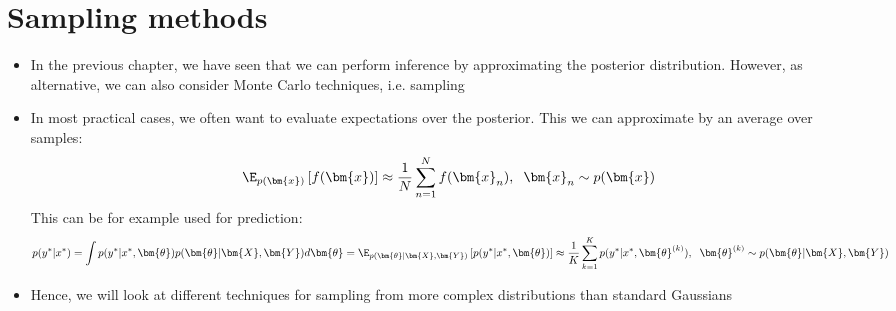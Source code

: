 \section{Sampling methods}
\begin{itemize}
	\item In the previous chapter, we have seen that we can perform inference by approximating the posterior distribution. However, as alternative, we can also consider Monte Carlo techniques, i.e. sampling
	\item In most practical cases, we often want to evaluate expectations over the posterior. This we can approximate by an average over samples:
	$$\E_{p(\bm{x})}\left[f(\bm{x})\right] \approx \frac{1}{N}\sum_{n=1}^{N} f(\bm{x}_n), \hspace{2mm} \bm{x}_n\sim p(\bm{x})$$
	This can be for example used for prediction:
	$$p(y^{*}|x^{*}) = \int p(y^{*}\vert x^{*}, \bm{\theta})p(\bm{\theta}|\bm{X}, \bm{Y})d\bm{\theta} = \E_{p(\bm{\theta}|\bm{X}, \bm{Y})}\left[p(y^{*}\vert x^{*}, \bm{\theta})\right] \approx \frac{1}{K}\sum_{k=1}^{K} p(y^{*}\vert x^{*}, \bm{\theta}^{(k)}), \hspace{2mm} \bm{\theta}^{(k)}\sim p(\bm{\theta}|\bm{X}, \bm{Y})$$
	\item Hence, we will look at different techniques for sampling from more complex distributions than standard Gaussians
\end{itemize}
